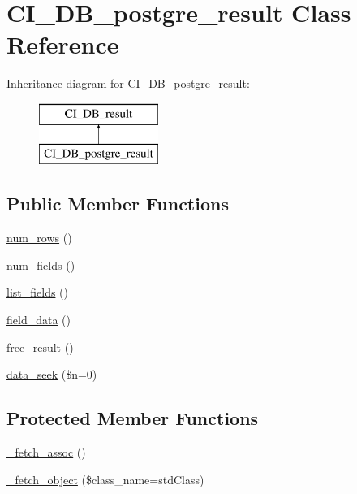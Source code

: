 \hypertarget{class_c_i___d_b__postgre__result}{}\section{C\+I\+\_\+\+D\+B\+\_\+postgre\+\_\+result Class Reference}
\label{class_c_i___d_b__postgre__result}
Inheritance diagram for C\+I\+\_\+\+D\+B\+\_\+postgre\+\_\+result\+:\begin{figure}[H]
\begin{center}
\leavevmode
\includegraphics[height=2.000000cm]{class_c_i___d_b__postgre__result}
\end{center}
\end{figure}
\subsection*{Public Member Functions}
\begin{DoxyCompactItemize}
\item 
\mbox{\hyperlink{class_c_i___d_b__postgre__result_a218657c303ee499b97710ab0cd2f5d6e}{num\+\_\+rows}} ()
\item 
\mbox{\hyperlink{class_c_i___d_b__postgre__result_af831bf363e4d7d661a717a4932af449d}{num\+\_\+fields}} ()
\item 
\mbox{\hyperlink{class_c_i___d_b__postgre__result_a50b54eb4ea7cfd039740f532988ea776}{list\+\_\+fields}} ()
\item 
\mbox{\hyperlink{class_c_i___d_b__postgre__result_a84bffd65e53902ade1591716749a33e3}{field\+\_\+data}} ()
\item 
\mbox{\hyperlink{class_c_i___d_b__postgre__result_aad2d98d6beb3d6095405356c6107b473}{free\+\_\+result}} ()
\item 
\mbox{\hyperlink{class_c_i___d_b__postgre__result_a8255ae91816e4206e29eb7581c5af0f1}{data\+\_\+seek}} (\$n=0)
\end{DoxyCompactItemize}
\subsection*{Protected Member Functions}
\begin{DoxyCompactItemize}
\item 
\mbox{\hyperlink{class_c_i___d_b__postgre__result_a43a9a92817f1334a1c10752ec44275a0}{\+\_\+fetch\+\_\+assoc}} ()
\item 
\mbox{\hyperlink{class_c_i___d_b__postgre__result_a60806be6a9c2488820813c2a7f4fef71}{\+\_\+fetch\+\_\+object}} (\$class\+\_\+name=\textquotesingle{}std\+Class\textquotesingle{})
\end{DoxyCompactItemize}
